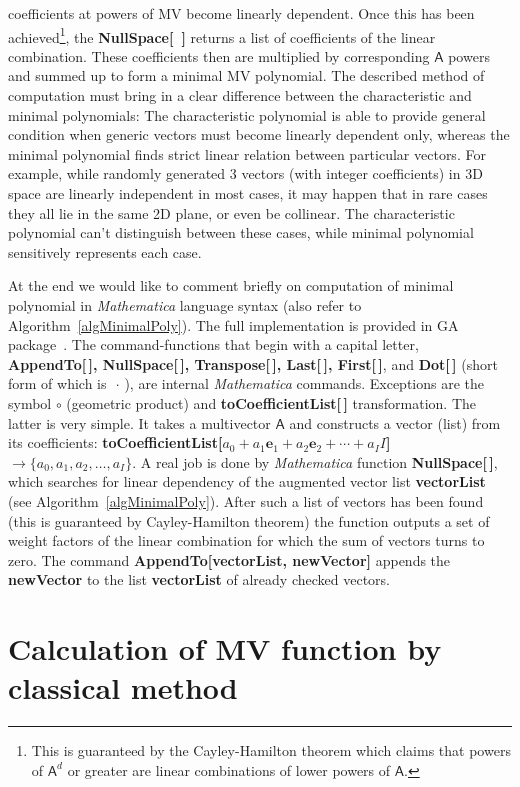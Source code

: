 \documentclass[AMA,STIX1COL]{WileyNJD-v2}
\def\m#1{\mathsf{#1}} %
\def\m#1{\mathsf{#1}}%
\def\e#1{\mathbf{e}_{#1}} %
\begin{document}
coefficients at powers of MV become linearly dependent. Once this has been achieved\footnote{This is guaranteed by the
Cayley-Hamilton theorem which claims that powers of $\m{A}^d$ or greater are linear combinations of lower powers of $\m{A}$.}, the {\bf NullSpace[~]} returns a list of coefficients of the linear combination. These coefficients then are multiplied by corresponding $\m{A}$
powers and summed up to form a minimal MV polynomial. The described method of computation must bring in a  clear difference
between the characteristic and minimal polynomials: The characteristic polynomial is able to provide general condition when generic vectors
must become linearly dependent only, whereas the minimal polynomial finds strict linear relation between particular vectors. For example, while
randomly generated 3 vectors (with integer coefficients) in 3D space are linearly independent in most cases, it may happen that in
rare cases they all lie in the same 2D plane, or even be collinear. The characteristic polynomial can't distinguish between these cases, while
minimal polynomial sensitively represents each case.


At the end  we would like to comment briefly on computation of minimal polynomial in {\it Mathematica} language syntax (also refer to
Algorithm~\ref{algMinimalPoly}). The full implementation is provided in GA package~\cite{AcusDargys2022}. The command-functions that begin with a capital letter, {\bf AppendTo[\,], NullSpace[\,], Transpose[\,], Last[\,], First[\,]}, and  {\bf Dot[\,]} (short form of which is $\,\cdot\,$),
are internal {\it Mathematica} commands. Exceptions are the symbol $\circ$ (geometric product) and {\bf toCoefficientList[\,]} transformation.
The latter is very simple. It takes a multivector $\m{A}$ and constructs a vector (list) from its coefficients:
{\bf toCoefficientList[$a_0+a_1\e{1}+a_2\e{2}+\cdots+a_I I$]}$\to \{a_0,a_1,a_2,\ldots,a_I \}$. A real job is done by {\it Mathematica}  function {\bf NullSpace[\,]}, which searches for linear dependency of the augmented vector list {\bf vectorList} (see Algorithm~\ref{algMinimalPoly}). After such a list of vectors has been found (this is guaranteed by Cayley-Hamilton theorem) the function outputs a set of weight factors of the linear combination for which the sum of vectors turns to zero. The command {\bf AppendTo[vectorList, newVector]} appends the {\bf newVector} to the list {\bf vectorList} of already checked vectors.



\section{Calculation of MV function by classical method}
\label{sec:classical}
\end{document}
